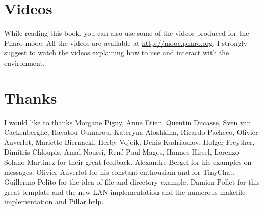 \documentclass[10pt,twoside,english]{_support/latex/sbabook/sbabook}
\begin{document}
\section{Videos }
While reading this book, you can also use some of the videos produced for the Pharo mooc. All the videos are available at \url{http://mooc.pharo.org}.
I strongly suggest to watch the videos explaining how to use and interact with the environment. 
\section{Thanks}
I would like to thanks Morgane Pigny, Anne Etien, Quentin Ducasse, Sven van Caekenberghe, Hayatou Oumarou, Kateryna Aloshkina, Ricardo Pacheco, Olivier Auverlot, Mariette Biernacki, Herby Vojcik, Denis Kudriashov, Holger Freyther, Dimitris Chloupis, Amal Noussi, Ren\'{e} Paul Mages, Hannes Hirsel, Lorenzo Solano Martinez for their great feedback.
Alexandre Bergel for his examples on messages. Olivier Auverlot for his constant enthousiam and for TinyChat. Guillermo Polito for the idea of file and directory example. Damien Pollet for this great template and the new LAN implementation and the numerous makefile implementation and Pillar help.



\backmatter



\end{document}
